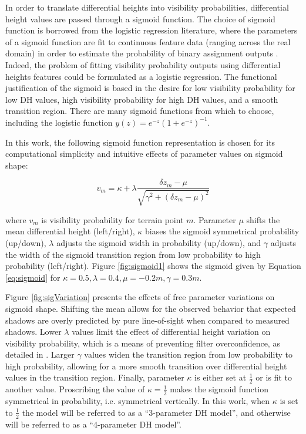 In order to translate differential heights into visibility probabilities, differential height values are passed through a sigmoid function.  The choice of sigmoid function is borrowed from the logistic regression literature, where the parameters of a sigmoid function are fit to continuous feature data (ranging across the real domain) in order to estimate the probability of binary assignment outputs \cite{Freedman2009}.  Indeed, the problem of fitting visibility probability outputs using differential heights features could be formulated as a logistic regression.  The functional justification of the sigmoid is based in the desire for low visibility probability for low DH values, high visibility probability for high DH values, and a smooth transition region.  There are many sigmoid functions from which to choose, including the logistic function $y(z) = e^{-z}(1 + e^{-z})^{-1}$. 

In this work, the following sigmoid function representation is chosen for its computational simplicity and intuitive effects of parameter values on sigmoid shape:

\begin{equation}
v_m =  \kappa + \lambda \frac{\delta z_m - \mu}{\sqrt{\gamma^2 + (\delta z_m - \mu)^2}} 
\label{eq:sigmoid}
\end{equation}

\noindent where $v_m$ is visibility probability for terrain point $m$. Parameter $\mu$ shifts the mean differential height (left/right), $\kappa$ biases the sigmoid symmetrical probability (up/down), $\lambda$ adjusts the sigmoid width in probability (up/down), and $\gamma$ adjusts the width of the sigmoid transition region from low probability to high probability (left/right). 
Figure \ref{fig:sigmoid1} shows the sigmoid given by Equation \ref{eq:sigmoid} for $\kappa = 0.5, \lambda = 0.4, \mu = -0.2m, \gamma = 0.3m$.

Figure \ref{fig:sigVariation} presents the effects of free parameter variations on sigmoid shape.
Shifting the mean allows for the observed behavior that expected shadows are overly predicted by pure line-of-sight when compared to measured shadows.  Lower $\lambda$ values limit the effect of differential height variation on visibility probability, which is a means of preventing filter overconfidence, as detailed in \cite{Thrun2005}. Larger $\gamma$ values widen the transition region from low probability to high probability, allowing for a more smooth transition over differential height values in the transition region. 
Finally, parameter $\kappa$ is either set at $\frac{1}{2}$ or is fit to another value.  Proscribing the value of $\kappa = \frac{1}{2}$ makes the sigmoid function symmetrical in probability, i.e. symmetrical vertically.  In this work, when $\kappa$ is set to $\frac{1}{2}$ the model will be referred to as a ``3-parameter DH model'', and otherwise will be referred to as a ``4-parameter DH model''.

